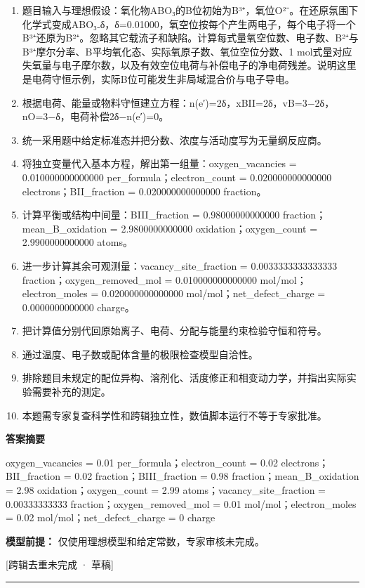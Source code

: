 \documentclass[UTF8,11pt,a4paper]{ctexart}
\begin{document}
\begin{enumerate}
\item 题目输入与理想假设：氧化物ABO₃的B位初始为B³⁺，氧位O²⁻。在还原氛围下化学式变成ABO₃₋δ，δ=0.01000，氧空位按每个产生两电子，每个电子将一个B³⁺还原为B²⁺。忽略其它载流子和缺陷。计算每式量氧空位数、电子数、B²⁺与B³⁺摩尔分率、B平均氧化态、实际氧原子数、氧位空位分数、1 mol式量对应失氧量与电子摩尔数，以及有效空位电荷与补偿电子的净电荷残差。说明这里是电荷守恒示例，实际B位可能发生非局域混合价与电子导电。
\item 根据电荷、能量或物料守恒建立方程：n(e′)=2δ，xBII=2δ，vB=3−2δ，nO=3−δ，电荷补偿2δ−n(e′)=0。
\item 统一采用题中给定标准态并把分数、浓度与活动度写为无量纲反应商。
\item 将独立变量代入基本方程，解出第一组量：oxygen\_vacancies = 0.010000000000000 per\_formula；electron\_count = 0.020000000000000 electrons；BII\_fraction = 0.020000000000000 fraction。
\item 计算平衡或结构中间量：BIII\_fraction = 0.98000000000000 fraction；mean\_B\_oxidation = 2.9800000000000 oxidation；oxygen\_count = 2.9900000000000 atoms。
\item 进一步计算其余可观测量：vacancy\_site\_fraction = 0.0033333333333333 fraction；oxygen\_removed\_mol = 0.010000000000000 mol/mol；electron\_moles = 0.020000000000000 mol/mol；net\_defect\_charge = 0.0000000000000 charge。
\item 把计算值分别代回原始离子、电荷、分配与能量约束检验守恒和符号。
\item 通过温度、电子数或配体含量的极限检查模型自洽性。
\item 排除题目未规定的配位异构、溶剂化、活度修正和相变动力学，并指出实际实验需要补充的测定。
\item 本题需专家复查科学性和跨辑独立性，数值脚本运行不等于专家批准。
\end{enumerate}
\noindent\textbf{答案摘要}\par
oxygen\_vacancies = 0.01 per\_formula；electron\_count = 0.02 electrons；BII\_fraction = 0.02 fraction；BIII\_fraction = 0.98 fraction；mean\_B\_oxidation = 2.98 oxidation；oxygen\_count = 2.99 atoms；vacancy\_site\_fraction = 0.00333333333 fraction；oxygen\_removed\_mol = 0.01 mol/mol；electron\_moles = 0.02 mol/mol；net\_defect\_charge = 0 charge\par
\noindent\textbf{模型前提：}
仅使用理想模型和给定常数，专家审核未完成。\par
\noindent\textcolor{red!65!black}{[跨辑去重未完成 · 草稿]} \par
\medskip\hrule\medskip
{}
\end{document}
